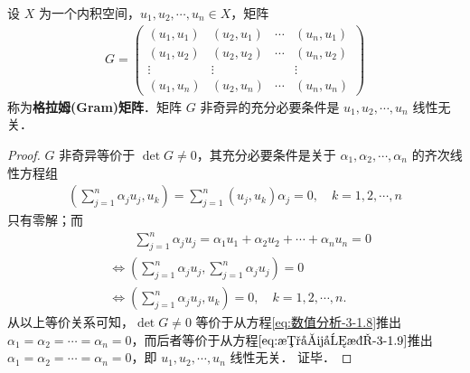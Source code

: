 \documentclass[../../main.tex]{subfiles}
\begin{document}
\begin{theorem}\label{theorem:数值分析-3-定理3}
设 \( X \) 为一个内积空间，\( u_1, u_2, \cdots, u_n \in X \)，矩阵
\begin{align}
G = \begin{pmatrix}
(u_1, u_1) & (u_2, u_1) & \cdots & (u_n, u_1) \\
(u_1, u_2) & (u_2, u_2) & \cdots & (u_n, u_2) \\
\vdots & \vdots & & \vdots \\
(u_1, u_n) & (u_2, u_n) & \cdots & (u_n, u_n)
\end{pmatrix} \label{eq:数值分析-3-1.7}
\end{align}
称为\textbf{格拉姆(Gram)矩阵}．矩阵 \( G\) 非奇异的充分必要条件是 \( u_1, u_2, \cdots, u_n \) 线性无关．
\end{theorem}
\begin{proof}
\(G \) 非奇异等价于 \( \det G \neq 0 \)，其充分必要条件是关于 \( \alpha_1, \alpha_2, \cdots, \alpha_n \) 的齐次线性方程组
\begin{align}
\left( \sum_{j=1}^n \alpha_j u_j, u_k \right) = \sum_{j=1}^n (u_j, u_k) \alpha_j = 0, \quad k = 1, 2, \cdots, n \label{eq:数值分析-3-1.8}
\end{align}
只有零解；而
\begin{align}
&\qquad \sum_{j=1}^n \alpha_j u_j = \alpha_1 u_1 + \alpha_2 u_2 + \cdots + \alpha_n u_n = 0 \label{eq:数值分析-3-1.9}\\
&\Leftrightarrow \left( \sum_{j=1}^n{\alpha _ju_j,\sum_{j=1}^n{\alpha _ju_j}} \right) =0 \nonumber
\\
&\Leftrightarrow \left( \sum_{j=1}^n{\alpha _ju_j,u_k} \right) =0,\quad k=1,2,\cdots ,n.\nonumber
\end{align}
从以上等价关系可知，\( \det G \neq 0 \) 等价于从方程\eqref{eq:数值分析-3-1.8}推出 \( \alpha_1 = \alpha_2 = \cdots = \alpha_n = 0 \)，而后者等价于从方程\(\eqref{eq:数值分析-3-1.9}\)推出 \( \alpha_1 = \alpha_2 = \cdots = \alpha_n = 0 \)，即 \( u_1, u_2, \cdots, u_n \) 线性无关．
证毕．
\end{proof}
\end{document}
